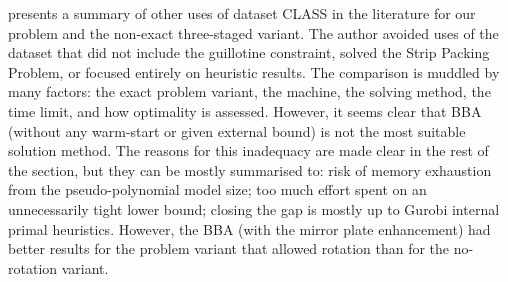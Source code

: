 presents a summary of other uses of dataset CLASS in the literature for our problem and the non-exact three-staged variant.
The author avoided uses of the dataset that did not include the guillotine constraint, solved the Strip Packing Problem, or focused entirely on heuristic results.
The comparison is muddled by many factors: the exact problem variant, the machine, the solving method, the time limit, and how optimality is assessed.
However, it seems clear that BBA (without any warm-start or given external bound) is not the most suitable solution method.
The reasons for this inadequacy are made clear in the rest of the section, but they can be mostly summarised to: risk of memory exhaustion from the pseudo-polynomial model size; too much effort spent on an unnecessarily tight lower bound; closing the gap is mostly up to Gurobi internal primal heuristics.
However, the BBA (with the mirror plate enhancement) had better results for the problem variant that allowed rotation than for the no-rotation variant.

